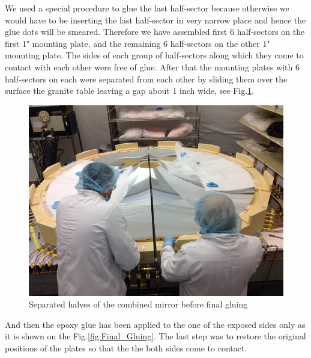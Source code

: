  We used a special procedure to glue the last half-sector because otherwise we would have to be inserting the last half-sector in very narrow place and hence the glue dots will be smeared. Therefore we have assembled first 6 half-sectors on the first 1" mounting plate, and the remaining 6 half-sectors on the other 1" mounting plate. The sides of each group of half-sectors along which they come to contact with each other were free of glue. After that the mounting plates with 6 half-sectors on each were separated from each other by sliding them over the surface the granite table leaving a gap about 1 inch wide, see Fig.\ref{fig:Separated_halves}.
 
  \begin{figure}[h]
    \centering
    \includegraphics[width=1.0\linewidth]{images/Separated_halves.jpg}
    \caption{Separated halves of the combined mirror before final gluing}
    \label{fig:Separated_halves}
\end{figure}
 
 And then the epoxy glue has been applied to the one of the exposed sides only as it is shown on the Fig.\ref{fig:Final_Gluing}. The last step was to restore the original positions of the plates so that the the both sides come to contact.         
 
